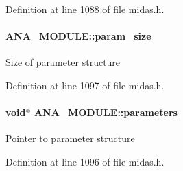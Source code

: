 Definition at line 1088 of file midas.h.
\paragraph[{param\_\-size}]{ {\bf ANA\_\-MODULE::param\_\-size}}\hfill\label{structANA__MODULE_a7402c042e2f62ed82d997f74bcc28251}
Size of parameter structure 

Definition at line 1097 of file midas.h.
\paragraph[{parameters}]{\setlength{\rightskip}{0pt plus 5cm}void$\ast$ {\bf ANA\_\-MODULE::parameters}}\hfill\label{structANA__MODULE_afebe80244b239178fbb56c656b7520fc}
Pointer to parameter structure 

Definition at line 1096 of file midas.h.